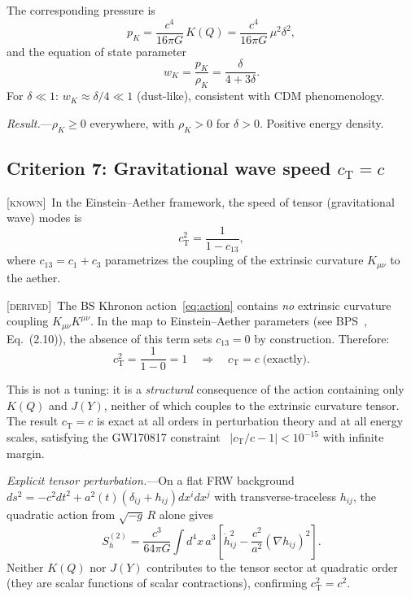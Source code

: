 \documentclass[prd,twocolumn,superscriptaddress,longbibliography,floatfix]{revtex4-2}
\newcommand{\cT}{c_{\mathrm{T}}}
\newcommand{\known}{\textsc{[known]}}
\newcommand{\derived}{\textsc{[derived]}}
\begin{document}
The corresponding pressure is
\begin{equation}
p_K = \frac{c^4}{16\pi G}\,K(Q)
= \frac{c^4}{16\pi G}\,\mu^2\delta^2,
\label{eq:pK}
\end{equation}
and the equation of state parameter
\begin{equation}
w_K = \frac{p_K}{\rho_K} = \frac{\delta}{4 + 3\delta}.
\label{eq:wK}
\end{equation}
For $\delta \ll 1$: $w_K \approx \delta/4 \ll 1$ (dust-like),
consistent with CDM phenomenology.

\textit{Result.}---$\rho_K \geq 0$ everywhere, with
$\rho_K > 0$ for $\delta > 0$.  Positive energy density.  \checkmark


\subsection{Criterion 7: Gravitational wave speed $\cT = c$}
\label{sec:cT}

\known\ In the Einstein--Aether framework, the speed of tensor
(gravitational wave) modes is~\cite{Jacobson2004,FosterJacobson2006}
\begin{equation}
\cT^2 = \frac{1}{1 - c_{13}},
\label{eq:cT_formula}
\end{equation}
where $c_{13} = c_1 + c_3$ parametrizes the coupling of the
extrinsic curvature $K_{\mu\nu}$ to the aether.

\derived\ The BS Khronon action~\eqref{eq:action} contains
\emph{no} extrinsic curvature coupling $K_{\mu\nu}K^{\mu\nu}$.
In the map to Einstein--Aether parameters
(see BPS~\cite{BPS2010}, Eq.~(2.10)), the absence of this
term sets $c_{13} = 0$ by construction.  Therefore:
\begin{equation}
\cT^2 = \frac{1}{1 - 0} = 1
\quad\Longrightarrow\quad
\cT = c \;\text{(exactly)}.
\label{eq:cT_exact}
\end{equation}

This is not a tuning: it is a \emph{structural} consequence
of the action containing only $K(Q)$ and $J(Y)$, neither
of which couples to the extrinsic curvature tensor.  The
result $\cT = c$ is exact at all orders in perturbation
theory and at all energy scales, satisfying the
GW170817 constraint~\cite{GW170817}
$|c_{\mathrm{T}}/c - 1| < 10^{-15}$ with infinite margin.

\textit{Explicit tensor perturbation.}---On a flat FRW background
$ds^2 = -c^2 dt^2 + a^2(t)(\delta_{ij} + h_{ij})dx^i dx^j$
with transverse-traceless $h_{ij}$, the quadratic action from
$\sqrt{-g}\,R$ alone gives
\begin{equation}
S_h^{(2)} = \frac{c^3}{64\pi G}\int\!d^4x\,a^3
\left[\dot h_{ij}^2 - \frac{c^2}{a^2}(\nabla h_{ij})^2\right].
\label{eq:Sh2}
\end{equation}
Neither $K(Q)$ nor $J(Y)$ contributes to the tensor sector at
quadratic order (they are scalar functions of scalar contractions),
confirming $\cT^2 = c^2$.
\end{document}
